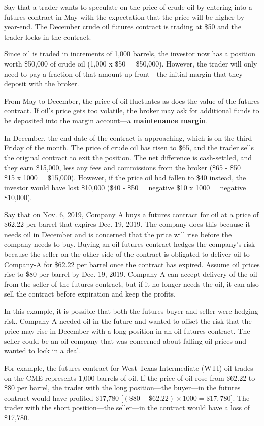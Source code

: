 \documentclass{article}
\begin{document}
      \begin{example}
        Say that a trader wants to speculate on the price of crude oil by entering into a futures contract in May with the expectation that the price will be higher by year-end. The December crude oil futures contract is trading at \$50 and the trader locks in the contract.

        Since oil is traded in increments of 1,000 barrels, the investor now has a position worth \$50,000 of crude oil (1,000 x \$50 = \$50,000). However, the trader will only need to pay a fraction of that amount up-front—the initial margin that they deposit with the broker. 

        From May to December, the price of oil fluctuates as does the value of the futures contract. If oil's price gets too volatile, the broker may ask for additional funds to be deposited into the margin account—a \textbf{maintenance margin}.

        In December, the end date of the contract is approaching, which is on the third Friday of the month. The price of crude oil has risen to \$65, and the trader sells the original contract to exit the position. The net difference is cash-settled, and they earn \$15,000, less any fees and commissions from the broker (\$65 - \$50 = \$15 x 1000 = \$15,000). However, if the price oil had fallen to \$40 instead, the investor would have lost \$10,000 (\$40 - \$50 = negative \$10 x 1000 = negative \$10,000).
      \end{example}

      \begin{example}
        Say that on Nov. 6, 2019, Company A buys a futures contract for oil at a price of \$62.22 per barrel that expires Dec. 19, 2019. The company does this because it needs oil in December and is concerned that the price will rise before the company needs to buy. Buying an oil futures contract hedges the company's risk because the seller on the other side of the contract is obligated to deliver oil to Company-A for \$62.22 per barrel once the contract has expired. Assume oil prices rise to \$80 per barrel by Dec. 19, 2019. Company-A can accept delivery of the oil from the seller of the futures contract, but if it no longer needs the oil, it can also sell the contract before expiration and keep the profits. 

        In this example, it is possible that both the futures buyer and seller were hedging risk. Company-A needed oil in the future and wanted to offset the risk that the price may rise in December with a long position in an oil futures contract. The seller could be an oil company that was concerned about falling oil prices and wanted to lock in a deal. 

        For example, the futures contract for West Texas Intermediate (WTI) oil trades on the CME represents 1,000 barrels of oil. If the price of oil rose from \$62.22 to \$80 per barrel, the trader with the long position—the buyer—in the futures contract would have profited \$17,780 [$(\$80 - \$62.22) \times 1000 = \$17,780$]. The trader with the short position—the seller—in the contract would have a loss of \$17,780.
      \end{example}
\end{document}
